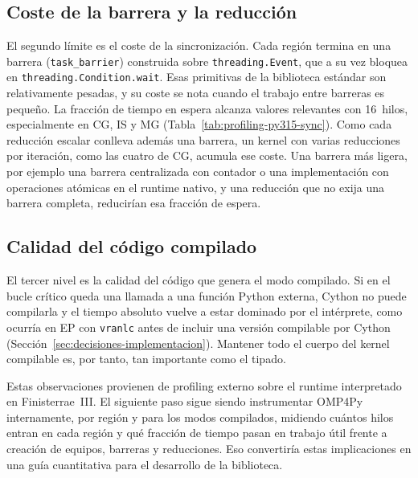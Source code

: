 \subsection{Coste de la barrera y la reducción}
El segundo límite es el coste de la sincronización. Cada región termina en una
barrera (\texttt{task\_barrier}) construida sobre \texttt{threading.Event}, que a
su vez bloquea en \texttt{threading.Condition.wait}. Esas primitivas de la
biblioteca estándar son relativamente pesadas, y su coste se nota cuando el
trabajo entre barreras es pequeño. La fracción de tiempo en espera alcanza
valores relevantes con 16~hilos, especialmente en CG, IS y MG
(Tabla~\ref{tab:profiling-py315-sync}).
Como cada reducción escalar conlleva además una barrera, un kernel con varias
reducciones por iteración, como las cuatro de CG, acumula ese coste. Una barrera
más ligera, por ejemplo una barrera centralizada con contador o una
implementación con operaciones atómicas en el runtime nativo, y una reducción que
no exija una barrera completa, reducirían esa fracción de espera.

\subsection{Calidad del código compilado}
El tercer nivel es la calidad del código que genera el modo compilado. Si en el
bucle crítico queda una llamada a una función Python externa, Cython no puede
compilarla y el tiempo absoluto vuelve a estar dominado por el intérprete, como
ocurría en EP con \texttt{vranlc} antes de incluir una versión compilable por Cython
(Sección~\ref{sec:decisiones-implementacion}). Mantener todo el cuerpo del kernel
compilable es, por tanto, tan importante como el tipado.

Estas observaciones provienen de profiling externo sobre el runtime interpretado
en Finisterrae~III. El siguiente paso sigue siendo instrumentar OMP4Py
internamente, por región y para los modos compilados, midiendo cuántos hilos
entran en cada región y qué fracción de tiempo pasan en trabajo útil frente a
creación de equipos, barreras y reducciones. Eso convertiría estas implicaciones
en una guía cuantitativa para el desarrollo de la biblioteca.
